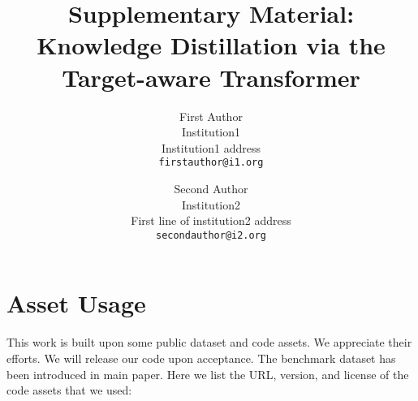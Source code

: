 \documentclass[10pt,letterpaper]{article}
\begin{document}
\title{Supplementary Material:\\ Knowledge Distillation via the Target-aware Transformer}

\author{First Author\\
Institution1\\
Institution1 address\\
{\tt\small firstauthor@i1.org}
\and
Second Author\\
Institution2\\
First line of institution2 address\\
{\tt\small secondauthor@i2.org}
}
\maketitle

\section{Asset Usage }
\label{sec:asset}
This work is built upon some public dataset and code assets. We appreciate their efforts. We will release our code upon acceptance. The benchmark dataset has been introduced in main paper. Here we list the URL, version, and license of the code assets that we used:
\end{document}
